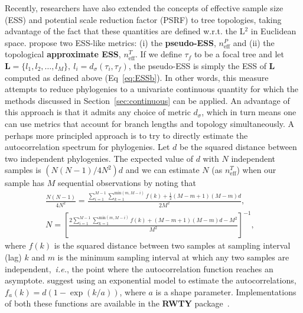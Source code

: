 Recently, researchers have also extended the concepts of effective sample size (ESS) and potential scale reduction factor (PSRF) to tree topologies, taking advantage of the fact that these quantities are defined w.r.t. the L$^2$ in Euclidean space.
\cite{Lanfear2016} propose two ESS-like metrics:  (i) the \textbf{pseudo-ESS}, $n_{\text{eff}}^P$ and (ii) the topological \textbf{approximate ESS}, $n_{\text{eff}}^T$.
If we define $\tau_f$ to be a focal tree and let $\boldsymbol L = \{l_1, l_2, \ldots, l_M \}, \: l_i = d_\sigma(\tau_i, \tau_f)$, the pseudo-ESS is simply the ESS of $\boldsymbol L$  computed as defined above (Eq~\ref{eq:ESSb}).
In other words, this measure attempts to reduce phylogenies to a univariate continuous quantity for which the methods discussed in Section~\ref{sec:continuous} can be applied.
An advantage of this approach is that it admits any choice of metric $d_\sigma$, which in turn means one can use metrics that account for branch lengths and topology simultaneously.
A perhaps more principled approach is to try to directly estimate the autocorrelation spectrum for phylogenies.
Let $d$ be the squared distance between two independent phylogenies.
The expected value of $d$ with $N$ independent samples is $(N(N-1)/4N^2)d$ and we can estimate $N$ (as $n_{\text{eff}}^T$) when our sample has $M$ sequential observations by noting that 
\begin{align}
\label{eq:topoApproxESS}
\frac{N(N-1)}{4N^2} = \frac{\sum_{i = 1}^{M-1} \sum_{k = 1}^{\text{min}(m, M-i)}f(k)  + \frac{1}{2}(M-m + 1)(M-m)d}{2M^2},&\\
N = \left[\frac{2\sum_{i = 1}^{M-1} \sum_{k = 1}^{\text{min}(m, M-i)}f(k)  + (M-m + 1)(M-m)d - M^2}{M^2}\right]^{-1},&
\end{align}
where $f(k)$ is the squared distance between two samples at sampling interval (lag) $k$ and $m$ is the minimum sampling interval at which any two samples are independent,~\textit{i.e.}, the point where the autocorrelation function reaches an asymptote.  
\cite{Lanfear2016} suggest using an exponential model to estimate the autocorrelations, $f_a(k) = d(1-\exp(k/a))$, where $a$ is a shape parameter.
Implementations of both these functions are available in the \textbf{RWTY} package~\citep{Warren2017}.

